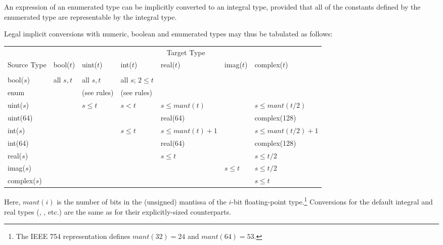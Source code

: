 An expression of an enumerated type can be implicitly converted
to an integral type, provided that all of the constants defined by the
enumerated type are representable by the integral type.


Legal implicit conversions with numeric, boolean and enumerated types
may thus be tabulated as follows:

\begin{center}
\begin{tabular}{l|llllll}
& \multicolumn{6}{c}{Target Type} \\ [4pt]

Source Type  & bool($t$) & uint($t$) & int($t$) & real($t$) & imag($t$) & complex($t$) \\  [3pt]

\cline{1-7} \\

bool($s$)    & all $s,t$ & all $s,t$   & all $s$; $2 \le t$ & & & \\ [7pt]

enum         &           & (see rules) & (see rules)        & & & \\ [7pt]

uint($s$)    & & $s \le t$ & $s < t$   & $s \le mant(t)$   & & $s \le mant(t/2)$   \\ [7pt]

uint(64)     & &           &           & real(64)          & & complex(128)        \\ [7pt]

int($s$)     & &           & $s \le t$ & $s \le mant(t)+1$ & & $s \le mant(t/2)+1$ \\ [7pt]

int(64)      & &           &           & real(64)          & & complex(128)        \\ [7pt]

real($s$)    & & & & $s \le t$ &           & $s \le t/2$ \\ [7pt]

imag($s$)    & & & &           & $s \le t$ & $s \le t/2$ \\ [7pt]

complex($s$) & & & &           &           & $s \le t$   \\ [5pt]

\end{tabular}
\end{center}
Here, $mant(i)$ is the number of bits in the (unsigned) mantissa of
the $i$-bit floating-point type.\footnote{The IEEE 754 representation
defines $mant(32)=24$ and $mant(64)=53$.}
%
Conversions for the default integral and real types (,
, etc.) are the same as for their
explicitly-sized counterparts.

